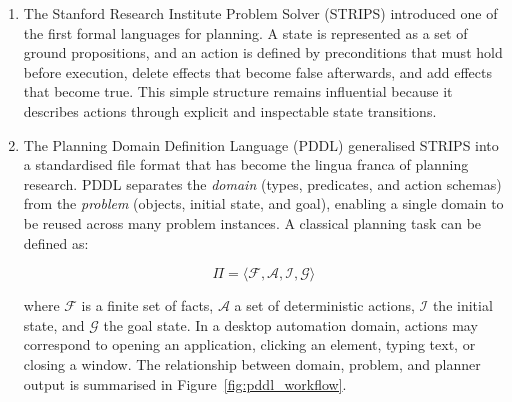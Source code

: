 \begin{enumerate}   
\item The Stanford Research Institute Problem Solver (STRIPS) \cite{FikesNilsson1971} introduced one of the first formal languages for planning. A state is represented as a set of ground propositions, and an action is defined by preconditions that must hold before execution, delete effects that become false afterwards, and add effects that become true. This simple structure remains influential because it describes actions through explicit and inspectable state transitions.

\item The Planning Domain Definition Language (PDDL) \cite{McDermott1998} generalised STRIPS into a standardised file format that has become the lingua franca of planning research. PDDL separates the \textit{domain} (types, predicates, and action schemas) from the \textit{problem} (objects, initial state, and goal), enabling a single domain to be reused across many problem instances. A classical planning task can be defined as:

\begin{equation}
    \Pi = \langle \mathcal{F}, \mathcal{A}, \mathcal{I}, \mathcal{G} \rangle
\end{equation}

\noindent where $\mathcal{F}$ is a finite set of facts, $\mathcal{A}$ a set of deterministic actions, $\mathcal{I}$ the initial state, and $\mathcal{G}$ the goal state. In a desktop automation domain, actions may correspond to opening an application, clicking an element, typing text, or closing a window. The relationship between domain, problem, and planner output is summarised in Figure~\ref{fig:pddl_workflow}.

\begin{figure}[H]
\centering
{}
\end{figure}
\end{enumerate}
